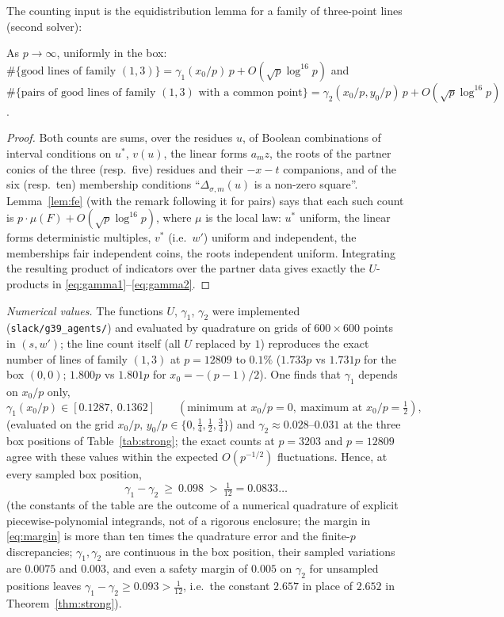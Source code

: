The counting input is the equidistribution lemma for a family of three-point lines (second solver):



\begin{proposition}\label{prop:counts}
As $p\to\infty$, uniformly in the box: $\#\{\text{good lines of family }(1,3)\}=\gamma_1(x_0/p)\,p+O(\sqrt p\log^{16}p)$ and
$\#\{\text{pairs of good lines of family }(1,3)\text{ with a common point}\}=\gamma_2(x_0/p,y_0/p)\,p+O(\sqrt p\log^{16}p)$.
\end{proposition}
\begin{proof}
Both counts are sums, over the residues $u$, of Boolean combinations of interval conditions on $u^*$, $v(u)$, the linear forms $a_mz$, the roots of the
partner conics of the three (resp.\ five) residues and their $-x-t$ companions, and of the six (resp.\ ten) membership conditions ``$\Delta_{\sigma,m}(u)$ is a
non-zero square''.  Lemma~\ref{lem:fe} (with the remark following it for pairs) says that each such count is $p\cdot\mu(F)+O(\sqrt p\log^{16}p)$, where
$\mu$ is the local law: $u^*$ uniform, the linear forms deterministic multiples, $v^*$ (i.e.\ $w'$) uniform and independent, the memberships fair independent
coins, the roots independent uniform.  Integrating the resulting product of indicators over the partner data gives exactly the $U$-products in
\eqref{eq:gamma1}--\eqref{eq:gamma2}.
\end{proof}

\emph{Numerical values.}  The functions $U$, $\gamma_1$, $\gamma_2$ were implemented (\texttt{slack/g39\_agents/}) and evaluated by quadrature on grids of
$600\times600$ points in $(s,w')$; the line count itself (all $U$ replaced by $1$) reproduces the exact number of lines of family $(1,3)$ at $p=12809$ to
$0.1\%$ ($1.733p$ vs $1.731p$ for the box $(0,0)$; $1.800p$ vs $1.801p$ for $x_0=-(p-1)/2$).  One finds that $\gamma_1$ depends on $x_0/p$ only,
\[
 \gamma_1(x_0/p)\in[0.1287,\ 0.1362]\qquad(\text{minimum at }x_0/p=0,\ \text{maximum at }x_0/p=\tfrac12),
\]
(evaluated on the grid $x_0/p,\,y_0/p\in\{0,\tfrac14,\tfrac12,\tfrac34\}$) and $\gamma_2\approx0.028$--$0.031$ at the three box positions of
Table~\ref{tab:strong}; the exact counts at $p=3203$ and $p=12809$ agree with these values within the expected $O(p^{-1/2})$ fluctuations.  Hence, at
every sampled box position,
\begin{equation}\label{eq:margin}
 \gamma_1-\gamma_2\ \ge\ 0.098\ >\ \tfrac1{12}=0.0833\ldots
\end{equation}
(the constants of the table are the outcome of a numerical quadrature of explicit piecewise-polynomial integrands, not of a rigorous enclosure; the
margin in \eqref{eq:margin} is more than ten times the quadrature error and the finite-$p$ discrepancies; $\gamma_1,\gamma_2$ are continuous in the
box position, their sampled variations are $0.0075$ and $0.003$, and even a safety margin of $0.005$ on $\gamma_2$ for unsampled positions leaves
$\gamma_1-\gamma_2\ge0.093>\tfrac1{12}$, i.e.\ the constant $2.657$ in place of $2.652$ in Theorem~\ref{thm:strong}).

